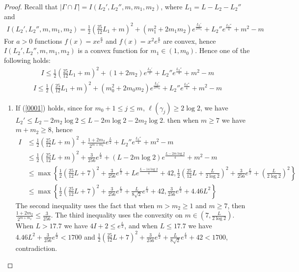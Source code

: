 \documentclass[11pt, a4paper]{article}
\theoremstyle{definition}
\theoremstyle{remark}
\newcommand{\abs}[1]{\left| #1 \right|}
\newcommand{\bracket}[1]{\left( #1 \right)}
\begin{document}
\begin{proof}
Recall that $\abs{\Gamma\cap\Gamma}=I(L_2',L_2'',m,m_1,m_2)$, where $L_1=L-L_2-L_2''$ and
\begin{align*}
I(L_2',L_2'',m,m_1,m_2)=\frac12\bracket{\frac{25}{12}L_1+m}^2+(m_1^2+2m_1m_2)e^{\frac{L_2'}{2m_1}}+{L_2''}e^{\frac{L_2''}4}+m^2-m
\end{align*}
For $a>0$ functions $f(x)=xe^{\frac{a}{x}}$ and $f(x)=x^2e^{\frac{a}{x}}$ are convex, hence $I(L_2',L_2'',m,m_1,m_2)$ is a convex function for $m_1\in(1,m_0)$. Hence one of the following holds:
\begin{align}\label{0001}
I\leqslant\frac12\bracket{\frac{25}{12}L_1+m}^2+(1+2m_2)e^{\frac{L_2'}{2}}+{L_2''}e^{\frac{L_2''}4}+m^2-m
\end{align}
\begin{align}\label{0002}
I\leqslant\frac12\bracket{\frac{25}{12}L_1+m}^2+(m_0^2+2m_0m_2)e^{\frac{L_2'}{2m_0}}+{L_2''}e^{\frac{L_2''}4}+m^2-m
\end{align}

\begin{enumerate}
\item
If (\ref{0001}) holds, since for $m_0+1\leqslant j\leqslant m$, $\ell(\gamma_j)\geqslant2\log2$, we have $L_2'\leqslant L_2-2m_2\log2\leqslant L-2m\log2-2m_2\log2$.  then when $m\geqslant7$ we have $m+m_2\geqslant8$, hence
\begin{align*}
 I&\leqslant\frac12\bracket{\frac{25}{12}L+m}^2+\frac{1+2m_2}{2^{m+m_2}}e^{\frac{L}{2}}+{L_2''}e^{\frac{L_2''}4}+m^2-m\\
&\leqslant\frac12\bracket{\frac{25}{12}L+m}^2+\frac{3}{256}e^{\frac{L}{2}}+(L-2m\log2)e^{\frac{L-2m\log2}4}+m^2-m\\
&\leqslant\max\left\{\frac12\bracket{\frac{25}{12}L+7}^2+\frac{3}{256}e^{\frac{L}{2}}+Le^{\frac{L-14\log2}4}+42,\frac12\bracket{\frac{25}{12}L+\frac{L}{2\log2}}^2+\frac{3}{256}e^{\frac{L}{2}}+\bracket{\frac{L}{2\log2}}^2\right\}\\
&\leqslant\max\left\{\frac12\bracket{\frac{25}{12}L+7}^2+\frac{3}{256}e^{\frac{L}{2}}+\frac{L}{8\sqrt2}e^{\frac{L}4}+42,\frac{3}{256}e^{\frac{L}{2}}+4.46L^2\right\}
\end{align*}
The second inequality uses the fact that when $m>m_2\geqslant1$ and $m\geqslant7$, then $\frac{1+2m_2}{2^{m+m_2}}\leqslant\frac3{256}$. The third inequality uses the convexity on $m\in(7,\frac{L}{2\log2})$. When $L>17.7$ we have $4I+2\leqslant e^{\frac{L}2}$, and when $L\leqslant17.7$ we have $4.46L^2+\frac{3}{256}e^{\frac{L}{2}}<1700$ and $\frac12\bracket{\frac{25}{12}L+7}^2+\frac{3}{256}e^{\frac{L}{2}}+\frac{L}{8\sqrt2}e^{\frac{L}4}+42<1700$, contradiction.


\end{enumerate}
\end{proof}
\end{document}
